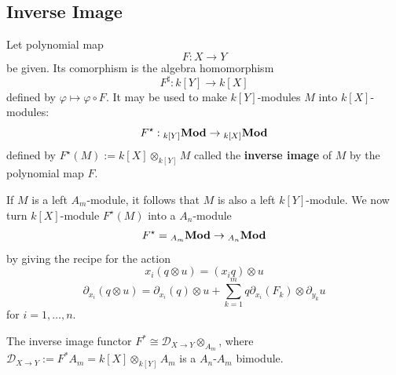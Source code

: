 \documentclass[12pt, oneside]{book}
\begin{document}
\chapter{}

\section{Inverse Image}
\begin{definition}
    Let polynomial map
    \begin{equation*}
        F:X\rightarrow Y
    \end{equation*}
    be given. Its comorphism is the algebra homomorphism
    \begin{equation*}
        F^{\sharp}: k[Y] \rightarrow k[X]
    \end{equation*}
    defined by $\varphi \mapsto \varphi \circ F$.
    It may be used to make $k[Y]$-modules $M$ into $k[X]$-modules:
    \begin{equation*}
        F^\star : {}_{k[Y]}\mathbf{Mod} \rightarrow {}_{k[X]}\mathbf{Mod}
    \end{equation*}
    defined by $F^{\star}(M):=k[X] \otimes_{k[Y]} M$   called the \textbf{inverse image} of $M$ by the polynomial map $F$.


\end{definition}

\begin{definition}
    If $M$ is a left $A_m$-module, it follows that $M$ is also a left $k[Y]$-module.
    We now turn $k[X]$-module $F^{\star}(M)$ into a $A_n$-module
    \begin{equation*}
        F^{\star}={}_{A_m}\mathbf{Mod} \rightarrow {}_{A_n}\mathbf{Mod}
    \end{equation*}
    by giving the recipe for the action
    \begin{equation*}
        x_i\left(q\otimes u \right)   =  (x_iq)\otimes u
    \end{equation*}
    \begin{equation*}
        \partial_{x_i}(q \otimes u)  =  \partial_{x_i}(q) \otimes u+\sum_{k=1}^m q \partial_{x_i}\left(F_k\right) \otimes \partial_{y_k} u
    \end{equation*}
    for $i=1, \ldots, n$.
    \begin{remark}
        The inverse image functor $F^* \cong \mathcal{D}_{X\rightarrow Y}\otimes_{A_m}$, where $\mathcal{D}_{X\rightarrow Y}:=F^* A_m=k[X]\otimes_{k[Y]} A_m$ is a $A_n$-$A_m$ bimodule.
    \end{remark}
\end{definition}
\end{document}

